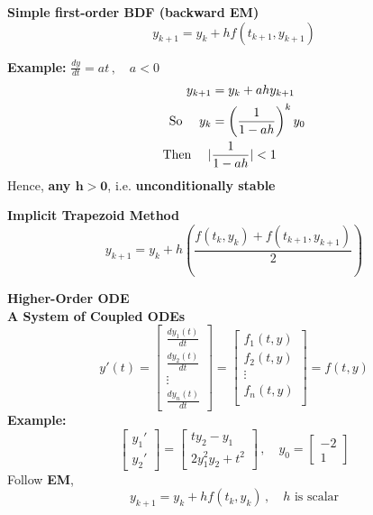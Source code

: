 \documentclass[9pt]{article}
\begin{document}
\begin{multicols}{3}
\textbf{Simple first-order BDF (backward EM)}
\[
y_{k+1} = y_k + hf(t_{k+1}, y_{k+1})
\]

\hdashrule{\linewidth}{0.5pt}{0.2mm 1mm}

\vspace{0.1cm}
\textbf{Example: } $\frac{dy}{dt} = at\, , \quad a<0$
\[
\begin{aligned}
y_{k+1} &= y_k + ahy_{k+1}\\
\text{So \quad} y_k &= \left( \frac{1}{1-ah} \right)^k y_0\\
\text{Then \quad} \lvert &\frac{1}{1-ah} \rvert < 1
\end{aligned}
\]
Hence, \textbf{any $\mathbf{h > 0}$}, i.e. \textbf{unconditionally stable}

\hdashrule{\linewidth}{0.5pt}{0.2mm 1mm}
\textbf{Implicit Trapezoid Method}
\[
y_{k+1} = y_k + h \left( \frac{f(t_k, y_k) + f(t_{k+1}, y_{k+1})}{2} \right)
\]

\hdashrule{\linewidth}{0.5pt}{0.2mm 1mm}
\textbf{Higher-Order ODE}\\
\textbf{A System of Coupled ODEs}
\[
y'(t) = 
\begin{bmatrix}
    \frac{dy_1(t)}{dt}\\
    \frac{dy_2(t)}{dt}\\
    \vdots\\
    \frac{dy_n(t)}{dt}
\end{bmatrix}
=\begin{bmatrix}
    f_1(t,y)\\
    f_2(t,y)\\
    \vdots\\
    f_n(t,y)\\
\end{bmatrix}
=f(t,y)
\]
\textbf{Example: }
\[
\begin{bmatrix}
    y_1'\\
    y_2'
\end{bmatrix}
=
\begin{bmatrix}
    ty_2-y_1\\
    2y_1^2y_2 + t^2
\end{bmatrix}\, , \quad
y_0 =
\begin{bmatrix}
    -2\\1
\end{bmatrix}
\]
Follow \textbf{EM},
\[
y_{k+1} = y_k + hf(t_k, y_k) \, , \quad h \text{ is scalar} 
\]

\vspace{-0.05cm}
\hdashrule{\linewidth}{0.5pt}{0.2mm 1mm}


\end{multicols}
\end{document}
